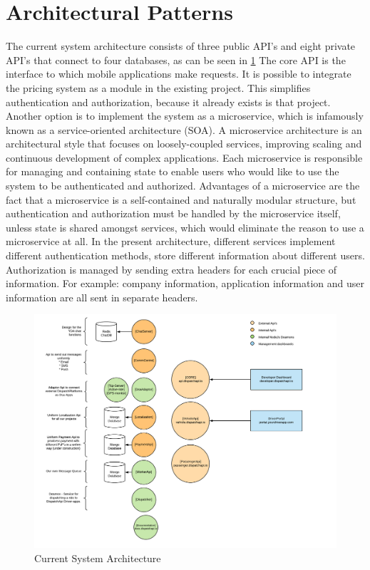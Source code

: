\section{Architectural Patterns}
The current system architecture consists of three public API's and eight private API's that connect to four databases, as can be seen in \ref{fig:Architecture} The core API is the interface to which mobile applications make requests. It is possible to integrate the pricing system as a module in the existing project. This simplifies authentication and authorization, because it already exists is that project. Another option is to implement the system as a microservice, which is infamously known as a service-oriented architecture (SOA). A microservice architecture is an architectural style that focuses on loosely-coupled services, improving scaling and continuous development of complex applications. Each microservice is responsible for managing and containing state to enable users who would like to use the system to be authenticated and authorized. Advantages of a microservice are the fact that a microservice is a self-contained and naturally modular structure, but authentication and authorization must be handled by the microservice itself, unless state is shared amongst services, which would eliminate the reason to use a microservice at all. In the present architecture, different services implement different authentication methods, store different information about different users. Authorization is managed by sending extra headers for each crucial piece of information. For example: company information, application information and user information are all sent in separate headers.

\begin{figure}[ht!]
	\centering
	\includegraphics[width=1\textwidth]{Architecture}
	\caption[Architecture]{Current System Architecture}
	\label{fig:Architecture}
\end{figure}
\clearpage

